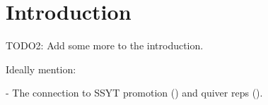 \documentclass[numbers=enddot,12pt,final,onecolumn,notitlepage]{scrartcl}%
\theoremstyle{definition}
\newenvironment{noncompile}{}{}
\begin{document}
%

\tableofcontents


\section*{Introduction}





\begin{noncompile}
TODO2: Add some more to the introduction.

Ideally mention:

- The connection to SSYT promotion (\cite[Proposition A.9]{Hopkin20}) and
quiver reps (\cite{GaPaTh18}).




\end{noncompile}
\end{document}
